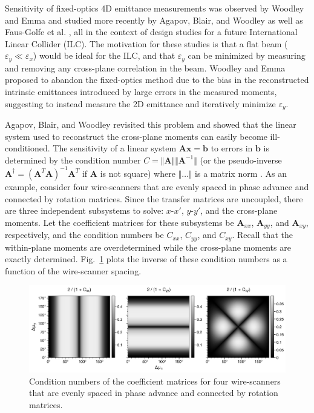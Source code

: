 Sensitivity of fixed-optics 4D emittance measurements was observed by Woodley and Emma \cite{Woodley2000} and studied more recently by Agapov, Blair, and Woodley \cite{Agapov2007} as well as Faus-Golfe et al. \cite{Faus-Golfe2016}, all in the context of design studies for a future International Linear Collider (ILC). The motivation for these studies is that a flat beam ($\varepsilon_y \ll \varepsilon_x$) would be ideal for the ILC, and that $\varepsilon_y$ can be minimized by measuring and removing any cross-plane correlation in the beam. Woodley and Emma proposed to abandon the fixed-optics method due to the bias in the reconstructed intrinsic emittances introduced by large errors in the measured moments, suggesting to instead measure the 2D emittance and iteratively minimize $\varepsilon_y$. 

Agapov, Blair, and Woodley revisited this problem and showed that the linear system used to reconstruct the cross-plane moments can easily become ill-conditioned. The sensitivity of a linear system $\mathbf{A} \mathbf{x} = \mathbf{b}$ to errors in $\mathbf{b}$ is determined by the condition number $C = \Vert \mathbf{A} \Vert \Vert \mathbf{A}^{-1} \Vert$ (or the pseudo-inverse $\mathbf{A}^\dagger = (\mathbf{A}^T\mathbf{A})^{-1} \mathbf{A}^T$ if $\mathbf{A}$ is not square) where $\Vert \dots \Vert$ is a matrix norm \cite{Golub1985}. As an example, consider four wire-scanners that are evenly spaced in phase advance and connected by rotation matrices. Since the transfer matrices are uncoupled, there are three independent subsystems to solve: $x$-$x'$, $y$-$y'$, and the cross-plane moments. Let the coefficient matrices for these subsystems be $\mathbf{A}_{xx}$, $\mathbf{A}_{yy}$, and $\mathbf{A}_{xy}$, respectively, and the condition numbers be $C_{xx}$, $C_{yy}$, and $C_{xy}$. Recall that the within-plane moments are overdetermined while the cross-plane moments are exactly determined. Fig.~\ref{fig:fodo_condition_number} plots the inverse of these condition numbers as a function of the wire-scanner spacing.
%
\begin{figure}[!p]
    \centering
    \vspace*{2cm}
    \includegraphics[width=\textwidth]{Images/chapter4/fodo_condition_number.png}
    \caption{Condition numbers of the coefficient matrices for four wire-scanners that are evenly spaced in phase advance and connected by rotation matrices.}
    \label{fig:fodo_condition_number}
    \vspace*{2cm}
\end{figure}
